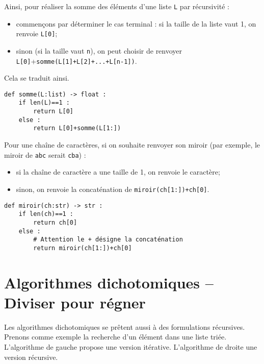 \noindent\begin{minipage}[c]{.45\linewidth}

Ainsi, pour réaliser la somme des éléments d'une liste \texttt{L} par récursivité : 
\begin{itemize}
\item commençons par déterminer le cas terminal : si la taille de la liste vaut 1, on renvoie \texttt{L[0]};
\item sinon (si la taille vaut \texttt{n}), on peut choisir de renvoyer \texttt{L[0]}+\texttt{somme(L[1]+L[2]+...+L[n-1])}. 
\end{itemize}
Cela se traduit ainsi.
\begin{lstlisting}
def somme(L:list) -> float :
    if len(L)==1 : 
        return L[0]
    else :
        return L[0]+somme(L[1:])
\end{lstlisting}
\end{minipage} \hfill
\begin{minipage}[c]{.53\linewidth}
Pour une chaîne de caractères, si on souhaite renvoyer son miroir (par exemple, le miroir de \texttt{abc} serait \texttt{cba}) : 
\begin{itemize}
\item si la chaîne de caractère a une taille de 1, on renvoie le caractère;
\item sinon, on renvoie la concaténation de  \texttt{miroir(ch[1:])+ch[0]}.
\end{itemize}
\begin{lstlisting}
def miroir(ch:str) -> str :
    if len(ch)==1 : 
        return ch[0]
    else :
        # Attention le + désigne la concaténation
        return miroir(ch[1:])+ch[0]
 \end{lstlisting}  
\end{minipage} 

\section{Algorithmes dichotomiques -- Diviser pour régner}

Les algorithmes dichotomiques se prêtent aussi à des formulations récursives. Prenons comme exemple la recherche d'un élément dans une liste triée. L'algorithme de gauche propose une version itérative. L'algorithme de droite une version récursive. 


